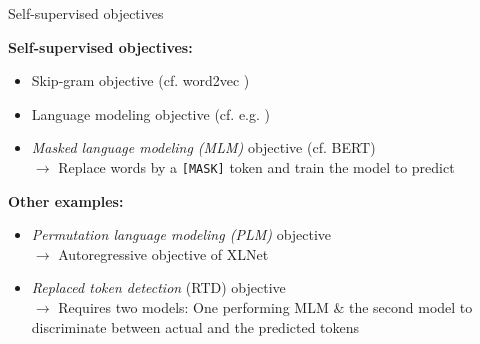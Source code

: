 \documentclass[11pt,compress,t,notes=noshow, xcolor=table]{beamer}
\begin{document}

\begin{frame}{Self-supervised objectives}

\vfill

\textbf{Self-supervised objectives:}
	
	\begin{itemize}
		\item Skip-gram objective (cf. word2vec )
		\item Language modeling objective (cf. e.g. )
		\item \textit{Masked language modeling (MLM)} objective (cf. BERT)\\
					$\rightarrow$ Replace words by a \texttt{[MASK]} token and train the model to predict
	\end{itemize}
	
\textbf{Other examples:}
	
	\begin{itemize}
		\item \textit{Permutation language modeling (PLM)} objective \\
					$\rightarrow$ Autoregressive objective of XLNet
		\item \textit{Replaced token detection} (RTD) objective \\
					$\rightarrow$ Requires two models: One performing MLM \& the second model to discriminate between actual and the predicted tokens
	\end{itemize}
	
\vfill

\end{frame}


\endlecture
\end{document}

